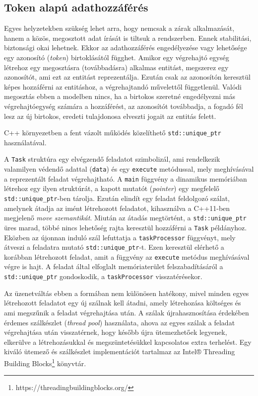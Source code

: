     \subsection{Token alapú adathozzáférés} 
    \label{seq:messagepassing}
    
    Egyes helyzetekben szükség lehet arra, hogy nemcsak a zárak alkalmazását, hanem a közös, megosztott adat írását is tiltsuk a rendszerben. Ennek stabilitási, biztonsági okai lehetnek. Ekkor az adathozzáférés engedélyezése vagy lehetősége egy azonosító (\emph{token}) birtoklásától függhet. Amikor egy végrehajtó egység létrehoz egy megosztásra (továbbadásra) alkalmas entitást, megszerez egy azonosítót, ami ezt az entitást reprezentálja. Ezután csak az azonosítón keresztül képes hozzáférni az entitáshoz, a végrehajtandó művelettől függetlenül. Valódi megosztás ebben a modelben nincs, ha a birtokos szeretné engedélyezni más végrehajtóegység számára a hozzáférést, az azonosítót továbbadja, a fogadó fél lesz az új birtokos, eredeti tulajdonosa elveszti jogait az entitás felett.
    
    C++ környezetben a fent vázolt működés közelíthető \texttt{std::unique\_ptr} használatával.
    
%
    A \texttt{Task} struktúra egy elvégzendő feladatot szimbolizál, ami rendelkezik valamilyen védendő adattal (\texttt{data}) és egy \texttt{execute} metódussal, mely meghívásával a reprezentált feladat végrehajtható. A \texttt{main} függvény a dinamikus memóriában létrehoz egy ilyen struktúrát, a kapott mutatót (\emph{pointer}) egy megfelelő \texttt{std::unique\_ptr}-ben tárolja. Ezután elindít egy feladat feldolgozó szálat, amelynek átadja az imént létrehozott feladatot, kihasználva a C++11-ben megjelenő \emph{move szemantikát}. Miután az átadás megtörtént, a \texttt{std::unique\_ptr} üres marad, többé nincs lehetőség rajta keresztül hozzáférni a \texttt{Task} példányhoz. Eközben az újonnan induló szál lefuttatja a \texttt{taskProcessor} függvényt, mely átveszi a feladatra mutató \texttt{std::unique\_ptr}-t. Ezen keresztül elérhető a korábban létrehozott feladat, amit a függvény az \texttt{execute} metódus meghívásával végre is hajt. A feladat által elfoglalt memóriaterület felszabadításáról a \texttt{std::unique\_ptr} gondoskodik, a \texttt{taskProcessor} visszatérésekor.
    
    Az üzenetváltás ebben a formában nem különösen hatékony, mivel minden egyes létrehozott feladatot egy új szálnak kell átadni, amely létrehozása költséges és ami megszűnik a feladat végrehajtása után. A szálak újrahasznosítása érdekében érdemes szálkészlet (\emph{thread pool}) használata, ahova az egyes szálak a feladat végrehajtása után visszatérnek, hogy később újra ütemezhetőek legyenek, elkerülve a létrehozásukkal és megszüntetésükkel kapcsolatos extra terhelést. Egy kiváló ütemező és szálkészlet implementációt tartalmaz az Intel® Threading Building Blocks\footnote{https://threadingbuildingblocks.org/} könyvtár.
    
